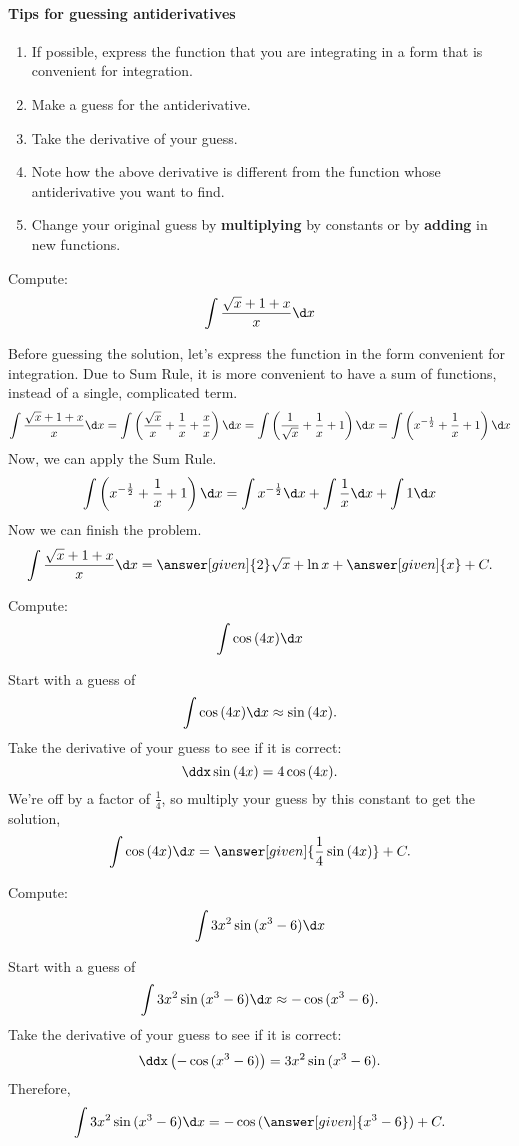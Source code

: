\documentclass{ximera}
\begin{document}
\paragraph{Tips for guessing antiderivatives}
\begin{enumerate}
\item If possible, express the function that you are integrating in a form that is convenient for integration.
\item Make a guess for the antiderivative.
\item Take the derivative of your guess.
\item Note how the above derivative is different from the function
  whose antiderivative you want to find.
\item Change your original guess by \textbf{multiplying} by constants
  or by \textbf{adding} in new functions.
\end{enumerate}


\begin{example}
Compute:
\[
\int \frac{\sqrt{x}+1+x}{x} \d x
\]
\begin{explanation}
Before guessing the solution, let's express  the function in the form convenient for integration. Due to Sum Rule, it is more convenient to have a sum of functions, instead of a single, complicated term.
\[
\int \frac{\sqrt{x}+1+x}{x} \d x=
\int \left(\frac{\sqrt{x}}{x}+\frac{1}{x}+\frac{x}{x}\right) \d x=\int \left(\frac{1}{\sqrt{x}}+\frac{1}{x}+1\right) \d x=\int \left(x^{-\frac{1}{2}}+\frac{1}{x}+1\right) \d x
\]
Now, we can apply the Sum Rule.
\[
\int \left(x^{-\frac{1}{2}}+\frac{1}{x}+1\right) \d x=\int x^{-\frac{1}{2}}\d x+\int\frac{1}{x}\d x+\int1 \d x
\]
Now we can finish the problem.
\[
\int \frac{\sqrt{x}+1+x}{x} \d x= \answer[given]{2}\sqrt{x}+\ln{x}+ \answer[given]{x} + C.
\]
\end{explanation}
\end{example}
\begin{example}
  Compute:
  \[
  \int \cos{(4x)} \d x
  \]
  \begin{explanation}
   
   Start with a guess of 
    \[
    \int \cos{(4x)} \d x \approx \sin{(4x)}.
    \]
    Take the derivative of your guess to see if it is correct:
    \[
    \ddx  \sin{(4x)} = 4 \cos{(4x)}.
    \]
    We're off by a factor of $\frac{1}{4}$, so multiply your guess by this constant
    to get the solution,
    \[
  \int \cos{(4x)} \d x = \answer[given]{\frac{1}{4}\sin{(4x)}}+C.
    \]
\end{explanation}
\end{example}
\begin{example}
  Compute:
  \[
  \int 3x^2\sin{(x^3 -6)} \d x
  \]
  \begin{explanation}
    Start with a guess of 
    \[
 \int 3x^2\sin{(x^3 -6)} \d x \approx -\cos{(x^3 -6)}.
    \]
    Take the derivative of your guess to see if it is correct:
    \[
    \ddx \left(-\cos{(x^3 -6)}\right) = 3x^2\sin{(x^3 -6)}.
    \]
   Therefore,
    \[
    \int 3x^2\sin{(x^3 -6)} \d x
 =- \cos{(\answer[given]{x^3 -6})}+C.
    \]
\end{explanation}
\end{example}
\end{document}
